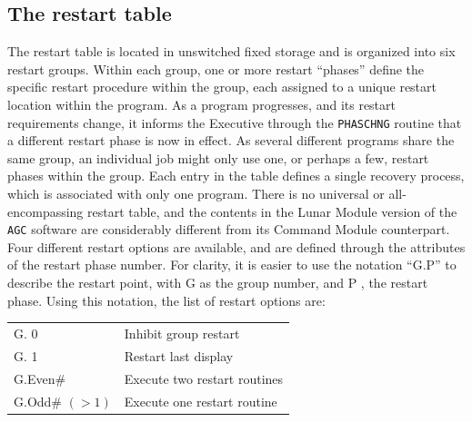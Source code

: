 \documentclass[refcap, oxford]{ahsan}
\begin{document}
\fi

\subsection{The restart table}

The restart table is located in unswitched fixed storage and is organized into six restart groups. Within each group, one or more restart ``phases'' define the specific restart procedure within the group, each assigned to a unique restart location within the program. As a program progresses, and its restart requirements change, it informs the Executive through the \texttt{PHASCHNG} routine that a different restart phase is now in effect. As several different programs share the same group, an individual job might only use one, or perhaps a few, restart phases within the group. Each entry in the table defines a single recovery process, which is associated with only one program. There is no universal or all-encompassing restart table, and the contents in the Lunar Module version of the \texttt{AGC} software are considerably different from its Command Module counterpart. Four different restart options are available, and are defined through the attributes of the restart phase number. For clarity, it is easier to use the notation ``G.P'' to describe the restart point, with G as the group number, and P , the restart phase. Using this notation, the list of restart options are:

\begin{table}[H]
    \begin{center}
        \begin{tabular}{ll}
            G. 0 & Inhibit group restart \\
            G. 1 & Restart last display \\
            G.Even\# & Execute two restart routines \\
            G.Odd\# $(>1)$ & Execute one restart routine \\
        \end{tabular}
    \end{center}
\end{table}
\vspace{-2em}
\end{document}
